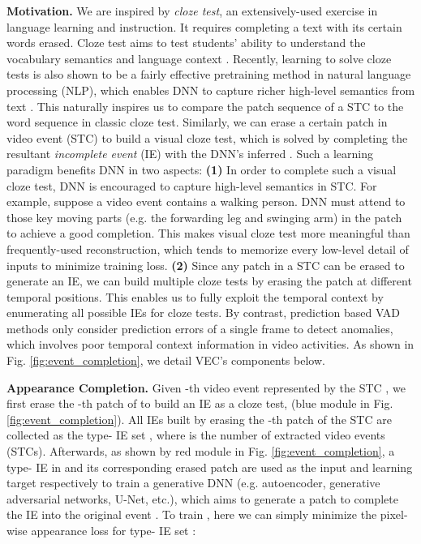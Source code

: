 \documentclass[sigconf]{acmart}
\begin{document}
\textbf{Motivation.}
We are inspired by \textit{cloze test}, an extensively-used exercise in language learning and instruction. It requires completing a text with its certain words erased. Cloze test aims to test students' ability to understand the vocabulary semantics and language context \cite{wiki_cloze_test}. Recently, learning to solve cloze tests is also shown to be a fairly effective pretraining method in natural language processing (NLP), which enables DNN to capture richer high-level semantics from text \cite{devlin2019bert}. This naturally inspires us to compare the patch sequence of a STC to the word sequence in classic cloze test. Similarly, we can erase a certain patch  in video event (STC) to build a visual cloze test, which is solved by completing the resultant \textit{incomplete event} (IE) with the DNN's inferred . Such a learning paradigm benefits DNN in two aspects: \textbf{(1)} In order to complete such a visual cloze test, DNN is encouraged to capture high-level semantics in STC. For example, suppose a video event contains a walking person. DNN must attend to those key moving parts (e.g. the forwarding leg and swinging arm) in the patch to achieve a good completion. This makes visual cloze test more meaningful than frequently-used reconstruction, which tends to memorize every low-level detail of inputs to minimize training loss. \textbf{(2)} Since any patch in a STC can be erased to generate an IE, we can build multiple cloze tests by erasing the patch at different temporal positions. This enables us to fully exploit the temporal context by enumerating all possible IEs for cloze tests. By contrast, prediction based VAD methods only consider prediction errors of a single frame to detect anomalies, which involves poor temporal context information in video activities. As shown in Fig. \ref{fig:event_completion}, we detail VEC's components below.

\textbf{Appearance Completion.}
Given -th video event represented by the STC , we first erase the -th patch  of  to build an IE  as a cloze test,  (blue module in Fig. \ref{fig:event_completion}). All IEs built by erasing the -th patch of the STC are collected as the type- IE set , where  is the number of extracted video events (STCs). Afterwards, as shown by red module in Fig. \ref{fig:event_completion}, a type- IE  in  and its corresponding erased patch  are used as the input and learning target respectively to train a generative DNN  (e.g. autoencoder, generative adversarial networks, U-Net, etc.), which aims to generate a patch  to complete the IE  into the original event . To train , here we can simply minimize the pixel-wise appearance loss  for type- IE set :
\end{document}
